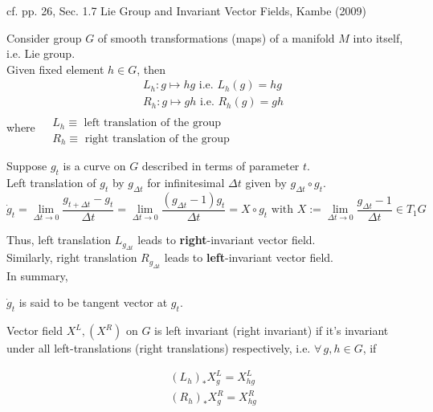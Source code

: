 \documentclass[10pt]{amsart}
\begin{document}
\begin{multicols*}{2}
cf. pp. 26, Sec. 1.7 Lie Group and Invariant Vector Fields, Kambe (2009) \cite{TKambe2009}

Consider group $G$ of smooth transformations (maps) of a manifold $M$ into itself, i.e. Lie group. \\

Given fixed element $h \in G$, then
\begin{equation}
\begin{aligned}
& L_h : g\mapsto hg \text{ i.e. } L_h(g) = hg \\
& R_h : g \mapsto gh \text{ i.e. } R_h(g) = gh
\end{aligned}
\end{equation}
where 
$ \begin{aligned} & \quad \\
& L_h \equiv \text{ left translation of the group } \\
& R_h \equiv \text{ right translation of the group } 
\end{aligned}$

Suppose $g_t$ is a curve on $G$ described in terms of parameter $t$. \\
Left translation of $g_t$ by $g_{\Delta t}$ for infinitesimal $\Delta t$ given by $g_{\Delta t} \circ g_t$. 
\begin{equation}
	\dot{g}_t = \lim_{\Delta t \to 0} \frac{g_{t + \Delta t} - g_t }{ \Delta t } = \lim_{\Delta t \to 0} \frac{ (g_{\Delta t} - 1) g_t }{ \Delta t} = X \circ g_t \text{ with } X := \lim_{\Delta t \to 0 } \frac{ g_{\Delta t} - 1}{ \Delta t}  \in T_1 G
\end{equation}

Thus, left translation $L_{g_{\Delta t}} $ leads to \textbf{right}-invariant vector field. \\
Similarly, right translation $R_{g_{\Delta t}}$ leads to \textbf{left}-invariant vector field. \\
In summary,


$\dot{g}_t$ is said to be tangent vector at $g_t$.

Vector field $X^L, (X^R)$ on $G$ is left invariant (right invariant) if it's invariant under all left-translations (right translations) respectively, i.e. $\forall \, g,h \in G$, if 

\begin{equation}
\begin{aligned}
	& (L_h)_* X^L_g = X^L_{hg} \\
	& (R_h)_* X^R_g = X^R_{hg} 	
\end{aligned}
\end{equation}


\end{multicols*}
\end{document}
